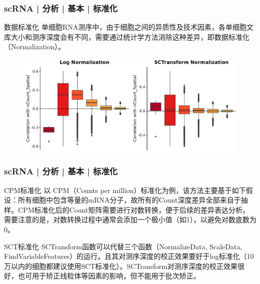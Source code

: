 \documentclass[11pt]{ctexbeamer}
\begin{document}
\begin{frame}
  \frametitle{scRNA | 分析 | 基本 | 标准化}
  \begin{block}{数据标准化}
  	单细胞RNA测序中，由于细胞之间的异质性及技术因素，各单细胞文库大小和测序深度会有不同，需要通过统计学方法消除这种差异，即数据标准化（Normalization）。
  \end{block}
  \begin{figure}
	\includegraphics[width=\textwidth]{scRNA_normalization_01.png}
\end{figure}
\end{frame}

\begin{frame}
  \frametitle{scRNA | 分析 | 基本 | 标准化}
  \begin{block}{CPM标准化}
  	以 CPM（Counts per million）标准化为例，该方法主要基于如下假设：所有细胞中包含等量的mRNA分子，故所有的Count深度差异全部来自于抽样。CPM标准化后的Count矩阵需要进行对数转换，便于后续的差异表达分析。需要注意的是，对数转换过程中通常会添加一个极小值（如1），以避免对数底数为0。
  \end{block}
 \begin{block}{SCT标准化}
 	SCTransform函数可以代替三个函数（NormalizeData, ScaleData, FindVariableFeatures）的运行。且其对测序深度的校正效果要好于log标准化（10万以内的细胞都建议使用SCT标准化）。SCTransform对测序深度的校正效果很好，也可用于矫正线粒体等因素的影响，但不能用于批次矫正。
\end{block}
\end{frame}
\end{document}
